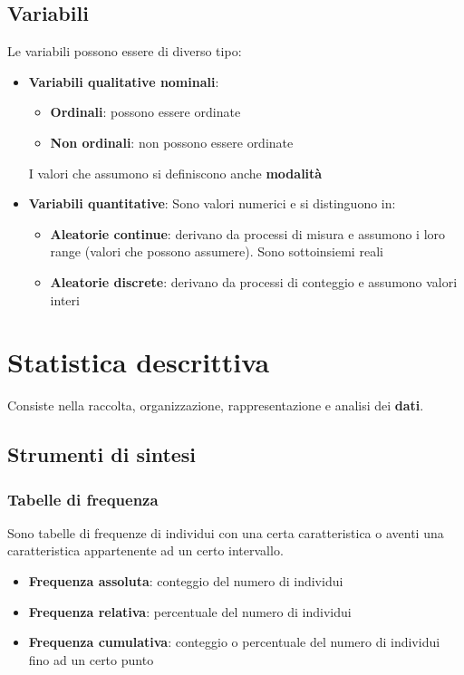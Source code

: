 \documentclass[a4paper]{article}
\theoremstyle{break}
\theoremstyle{break}
\theoremstyle{break}
\theoremstyle{break}
\begin{document}
\subsection{Variabili}
Le variabili possono essere di diverso tipo:
\begin{itemize}
	\item \textbf{Variabili qualitative nominali}:
	      \begin{itemize}
		      \item \textbf{Ordinali}: possono essere ordinate
		      \item \textbf{Non ordinali}: non possono essere ordinate
	      \end{itemize}
	      I valori che assumono si definiscono anche \textbf{modalità}
	\item \textbf{Variabili quantitative}:
	      Sono valori numerici e si distinguono in:
	      \begin{itemize}
		      \item \textbf{Aleatorie continue}: derivano da processi di misura e assumono
		            i loro range (valori che possono assumere). Sono sottoinsiemi reali
		      \item \textbf{Aleatorie discrete}: derivano da processi di conteggio e
		            assumono valori interi
	      \end{itemize}
\end{itemize}


\section{Statistica descrittiva}
Consiste nella raccolta, organizzazione, rappresentazione e analisi dei \textbf{dati}.

\subsection{Strumenti di sintesi}
\subsubsection{Tabelle di frequenza}
Sono tabelle di frequenze di individui con una certa caratteristica o aventi una caratteristica
appartenente ad un certo intervallo.
\begin{itemize}
	\item \textbf{Frequenza assoluta}: conteggio del numero di individui
	\item \textbf{Frequenza relativa}: percentuale del numero di individui
	\item \textbf{Frequenza cumulativa}: conteggio o percentuale del numero di individui
	      fino ad un certo punto
\end{itemize}
\end{document}
